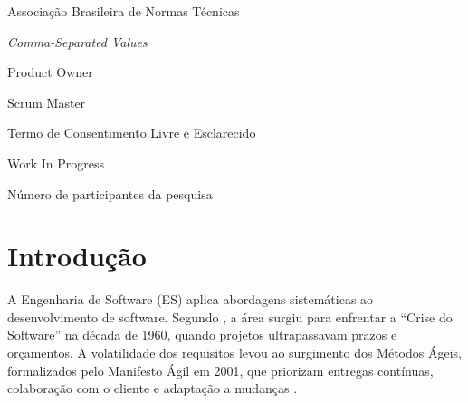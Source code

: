 \documentclass[12pt, oneside, a4paper, chapter=TITLE,section=TITLE]{abntex2}
\begin{document}
\frenchspacing

\pretextual
\imprimircapa %
\imprimirfolhaderosto %

 \listoffigures*
\cleardoublepage

\listoftables*
\cleardoublepage

 \listofquadros*
\cleardoublepage

\begin{siglas}
  \item[ABNT] Associação Brasileira de Normas Técnicas
  \item[CSV] \textit{Comma-Separated Values}
  \item[PO] Product Owner
  \item[SM] Scrum Master
  \item[TCLE] Termo de Consentimento Livre e Esclarecido
  \item[WIP] Work In Progress
\end{siglas}

\begin{simbolos}
  \item[$N$] Número de participantes da pesquisa
\end{simbolos}

\tableofcontents*

\textual

\chapter{Introdução}

A Engenharia de Software (ES) aplica abordagens sistemáticas ao desenvolvimento de software. Segundo \cite{sommerville2016engenharia}, a área surgiu para enfrentar a ``Crise do Software'' na década de 1960, quando projetos ultrapassavam prazos e orçamentos. A volatilidade dos requisitos levou ao surgimento dos Métodos Ágeis, formalizados pelo Manifesto Ágil em 2001, que priorizam entregas contínuas, colaboração com o cliente e adaptação a mudanças \cite{prikladnicki2014ageis}.
\end{document}
